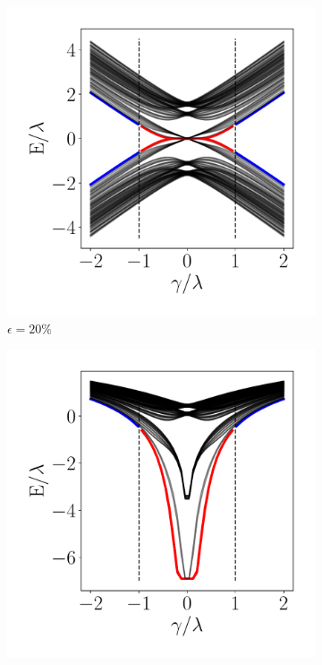 \begin{figure}[h!]
     \begin{minipage}[h!]{0.9\textwidth}
         \begin{subfigure}[b!]{0.3 \textwidth}
            \caption{$\epsilon = 20\%$}             \includegraphics[width=\textwidth]{Imagenes/Resultados_Hoti_Fractal/bands_square_shh_0.2.pdf}
         \end{subfigure}\hspace*{-0.5em}
         \begin{subfigure}[b!]{0.3 \textwidth}
            \caption*{}
            \includegraphics[width=\textwidth]{Imagenes/Resultados_Hoti_Fractal/bands_square_shh_log0.2.pdf}

\end{subfigure}
\end{minipage}
\end{figure}
